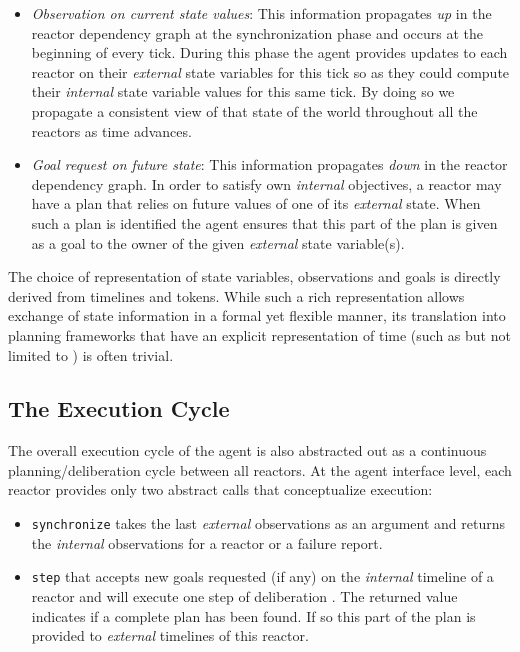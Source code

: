 \begin{itemize}

\item {\em Observation on current state values}: This information
  propagates \emph{up} in the reactor dependency graph at the
  synchronization phase and occurs at the beginning of every
  tick. During this phase the agent provides updates to each reactor
  on their {\em external} state variables for this tick so as they
  could compute their {\em internal} state variable values for this
  same tick. By doing so we propagate a consistent view of that state
  of the world throughout all the reactors as time
  advances. 

\item {\em Goal request on future state}: This information propagates
  \emph{down} in the reactor dependency graph. In order to satisfy own
  {\em internal} objectives, a reactor may have a plan that relies on
  future values of one of its {\em external} state. When such a plan
  is identified the agent ensures that this part of the plan is given
  as a goal to the owner of the given {\em external} state
  variable(s). 

\end{itemize}

The choice of representation of state variables, observations and
goals is directly derived from \eu timelines and tokens.  While such a
rich representation allows exchange of state information in a formal
yet flexible manner, its translation into planning frameworks that
have an explicit representation of time (such as but not limited to
\eu) is often trivial.

\subsection{The Execution Cycle}
\label{sec:arch:exec}

The overall execution cycle of the agent is also abstracted out as a
continuous planning/deliberation cycle between all reactors. At the
agent interface level, each reactor provides only two abstract calls
that conceptualize execution:

\begin{itemize}

\item \texttt{synchronize} takes the last {\em external} observations
  as an argument and returns the {\em internal} observations for a
  reactor or a failure report.

\item \texttt{step} that accepts new goals requested (if any) on the
  {\em internal} timeline of a reactor and will execute one step of
  deliberation . The returned value indicates if a complete plan has
  been found. If so this part  of the plan is
  provided to {\em external} timelines of this reactor.

\end{itemize}

